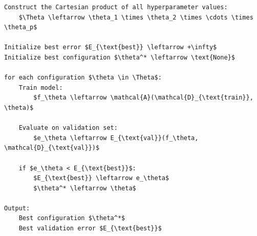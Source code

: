 \begin{enumerate}
\begin{lstlisting}[language=pseudo-code,mathescape=true,style={pseudocode-style},caption={Grid Search Algorithm}]
Construct the Cartesian product of all hyperparameter values:
    $\Theta \leftarrow \theta_1 \times \theta_2 \times \cdots \times \theta_p$

Initialize best error $E_{\text{best}} \leftarrow +\infty$
Initialize best configuration $\theta^* \leftarrow \text{None}$

for each configuration $\theta \in \Theta$:
    Train model:
        $f_\theta \leftarrow \mathcal{A}(\mathcal{D}_{\text{train}}, \theta)$

    Evaluate on validation set:
        $e_\theta \leftarrow E_{\text{val}}(f_\theta, \mathcal{D}_{\text{val}})$

    if $e_\theta < E_{\text{best}}$:
        $E_{\text{best}} \leftarrow e_\theta$
        $\theta^* \leftarrow \theta$

Output:
    Best configuration $\theta^*$
    Best validation error $E_{\text{best}}$
\end{lstlisting}



\end{enumerate}
